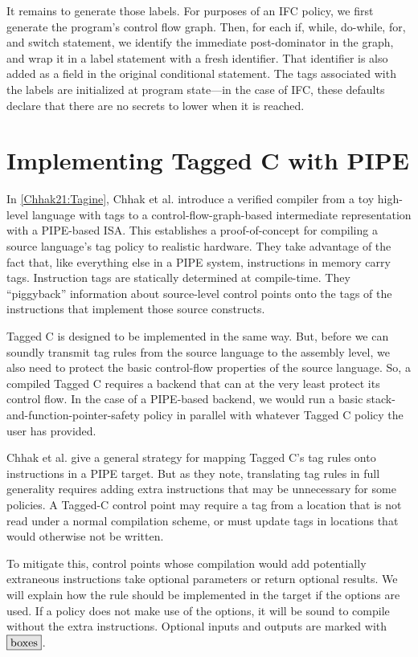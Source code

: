 \documentclass{llncs}
\begin{document}
It remains to generate those labels. For purposes of an IFC policy, we first generate the program's
control flow graph. Then, for each if, while, do-while, for, and switch statement, we identify the
immediate post-dominator in the graph, and wrap it in a label statement with a fresh identifier.
That identifier is also added as a field in the original conditional statement. The tags
associated with the labels are initialized at program state---in the case of IFC, these defaults
declare that there are no secrets to lower when it is reached.

\section{Implementing Tagged C with PIPE}
\label{sec:optionals}

In \cref{Chhak21:Tagine}, Chhak et al. introduce a verified compiler from a toy
high-level language with tags
to a control-flow-graph-based intermediate representation with a PIPE-based
ISA. This establishes a proof-of-concept for compiling a source language's tag policy to
realistic hardware. They take advantage of the fact that, like everything else in a PIPE system,
instructions in memory carry tags. Instruction tags are statically determined at compile-time.
They ``piggyback'' information about source-level control points onto the tags of the instructions
that implement those source constructs.

Tagged C is designed to be implemented in the same way. But, before we can soundly transmit
tag rules from the source language to the assembly level, we also need to protect the basic
control-flow properties of the source language. So, a compiled Tagged C requires a backend that
can at the very least protect its control flow. In the case of a PIPE-based backend, we would
run a basic stack-and-function-pointer-safety policy in parallel with whatever Tagged C policy
the user has provided.

Chhak et al. \cite{Chhak21:Tagine} give a general strategy for mapping Tagged C's tag rules
onto instructions in a PIPE target. But as they note, translating tag rules in full generality
requires adding extra instructions that may be unnecessary for some policies. A Tagged-C control point
may require a tag from a location that is not read under a normal compilation scheme, or must update tags
in locations that would otherwise not be written.

To mitigate this, control points whose compilation would add potentially extraneous instructions
take optional parameters or return optional results. We will explain how the rule should be
implemented in the target if the options are used. If a policy does not make use of the options, it will
be sound to compile without the extra instructions. Optional inputs
and outputs are marked with \(\optional{boxes}\).
\end{document}
